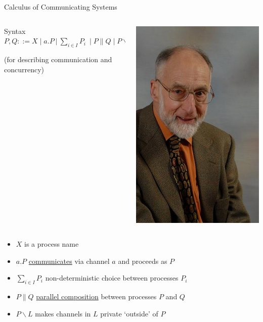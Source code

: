 \documentclass{beamer}
\begin{document}
\begin{frame}{Calculus of Communicating Systems}

  \begin{minipage}[0.3\textheight]{\textwidth}
  \begin{columns}[c]
  \begin{column}{0.8\textwidth}
    \begin{block}{Syntax}
      $P,Q ::= X \mid a . P\ |\ \sum_{ i \in I} P_i \ \mid P \parallel Q 
      \mid P \backslash L$
    \end{block}
    (for describing communication and concurrency)
  \end{column}
  \begin{column}{0.23\textwidth}
    \includegraphics[scale=0.25]{images/Milner.jpg}
  \end{column}
  \end{columns}
  \end{minipage}
  \begin{itemize}
  \item $X$ is a process name
  \item $a. P$ \underline{communicates} via channel $a$ and proceeds as $P$
  \item $\sum_{ i \in I} P_i$ non-deterministic choice between processes $P_i$
  \item $P \parallel Q$ \underline{parallel composition} 
          between processes $P$ and $Q$
  \item $P \backslash L$ makes channels in $L$ private `outside' of $P$
  \end{itemize}
\end{frame}
\end{document}
